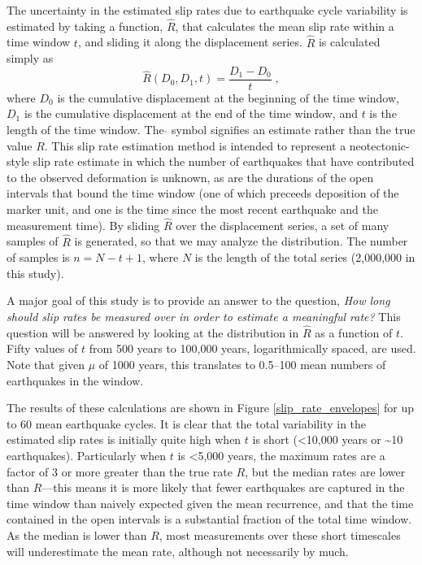 \documentclass[se]{copernicus}
\begin{document}
The uncertainty in the estimated slip rates due to earthquake cycle
variability is estimated by taking a function, \(\hat{R}\), that
calculates the mean slip rate within a time window \(t\), and sliding it
along the displacement series. \(\hat{R}\) is calculated simply as
\begin{equation}
  \hat{R}(D_0,D_1,t) = \frac{D_1 - D_0}{t}\; ,
  \label{eqn-rate-calc}
\end{equation}
where \(D_0\) is the cumulative displacement at the beginning of the
time window, \(D_1\) is the cumulative displacement at the end of the
time window, and \(t\) is the length of the time window. The \(\hat{}\)
symbol signifies an estimate rather than the true value \(R\). This slip rate
estimation method is intended to represent a neotectonic-style slip rate
estimate in which the number of earthquakes that have contributed to the
observed deformation is unknown, as are the durations of the open intervals that
bound the time window (one of which preceeds deposition of the marker unit, and
one is the time since the most recent earthquake and the measurement time).
By sliding \(\hat{R}\) over the displacement series, a set of many samples of
\(\hat{R}\) is generated, so that we may analyze the distribution. The number
of samples is \(n = N - t + 1\), where \(N\) is the length of the total
series (2,000,000 in this study).

A major goal of this study is to provide an answer to the question, \emph{How
long should slip rates be measured over in order to estimate a meaningful
rate?} This question will be answered by looking at the distribution in
\(\hat{R}\) as a function of \(t\). Fifty values of \(t\) from 500 years to
100,000 years, logarithmically spaced, are used. Note that given \(\mu\) of
1000 years, this translates to 0.5--100 mean numbers of earthquakes in the
window.

The results of these calculations are shown in Figure
\ref{slip_rate_envelopes} for up to 60 mean earthquake cycles. It is clear
that the total variability in the estimated slip rates is initially quite
high when \(t\) is short (\textless{}10,000 years or \textasciitilde{}10
earthquakes). Particularly when \(t\) is \textless{}5,000 years, the maximum
rates are a factor of 3 or more greater than the true rate \(R\), but the
median rates are lower than \(R\)---this means it is more likely that fewer
earthquakes are captured in the time window than naively expected given the
mean recurrence, and that the time contained in the open intervals is a
substantial fraction of the total time window. As the median is lower than
\(R\), most measurements over these short timescales will underestimate the
mean rate, although not necessarily by much.
\end{document}
